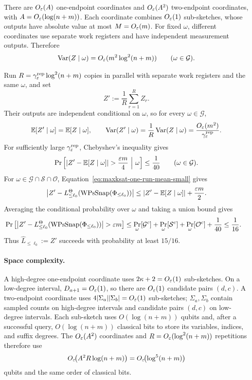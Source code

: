 There are $O_\varepsilon(A)$ one-endpoint coordinates and $O_\varepsilon(A^2)$ two-endpoint coordinates, with $A=O_\varepsilon(\log(n+m))$.
Each coordinate combines $O_\varepsilon(1)$ sub-sketches, whose outputs have absolute value at most $M=O_\varepsilon(m)$.
For fixed $\omega$, different coordinates use separate work registers and have independent measurement outputs. Therefore
\begin{equation}\label{eq:maxksat-one-run-var}
\operatorname{Var}(Z\mid\omega)=O_\varepsilon(m^2\log^2(n+m))
\qquad(\omega\in\mathcal G).
\end{equation}

Run $R=\gamma^{\mathrm{rep}}_\varepsilon\log^2(n+m)$ copies in parallel with separate work registers and the same $\omega$, and set
\[
Z':=\frac1R\sum_{r=1}^R Z_r.
\]
Their outputs are independent conditional on $\omega$, so for every $\omega\in\mathcal G$,
\[
\mathbb E[Z'\mid\omega]=\mathbb E[Z\mid\omega],\qquad
\operatorname{Var}(Z'\mid\omega)
=\frac1R\operatorname{Var}(Z\mid\omega)
=\frac{O_\varepsilon(m^2)}{\gamma^{\mathrm{rep}}_\varepsilon}.
\]
For sufficiently large $\gamma^{\mathrm{rep}}_\varepsilon$, Chebyshev's inequality gives
\[
\Pr\left[\left|Z'-\mathbb E[Z\mid\omega]\right|>\frac{\eps m}{4}
\ \middle|\ \omega\right]\le\frac1{40}
\qquad(\omega\in\mathcal G).
\]
For $\omega\in\mathcal G\cap\mathcal S\cap\mathcal O$, Equation~\eqref{eq:maxksat-one-run-mean-small} gives
\[
\left|Z'-L_{\le\ell_0}^\Theta(\operatorname{WPsSnap}(\Phi_{\le\ell_0}))\right|
\le\left|Z'-\mathbb E[Z\mid\omega]\right|+\frac{\varepsilon m}{2}.
\]
Averaging the conditional probability over $\omega$ and taking a union bound gives
\[
\begin{aligned}
&\Pr\left[\left|Z'-L_{\le\ell_0}^\Theta(\PsSnap(\Phi_{\le\ell_0}))\right|>\eps m\right]
\le\Pr_\omega[\mathcal G^c]+\Pr_\omega[\mathcal S^c]+\Pr_\omega[\mathcal O^c]+\frac1{40}\le\frac1{16}.
\end{aligned}
\]
Thus $\widehat L_{\le\ell_0}:=Z'$ succeeds with probability at least $15/16$.

\paragraph{Space complexity.}
A high-degree one-endpoint coordinate uses $2\kappa+2=O_\varepsilon(1)$ sub-sketches.
On a low-degree interval, $D_{a+1}=O_\varepsilon(1)$, so there are $O_\varepsilon(1)$ candidate pairs $(d,c)$.
A two-endpoint coordinate uses $4|\Sigma_a||\Sigma_b|=O_\varepsilon(1)$ sub-sketches; $\Sigma_a,\Sigma_b$ contain sampled counts on high-degree intervals and candidate pairs $(d,c)$ on low-degree intervals.
Each sub-sketch uses $O(\log(n+m))$ qubits and, after a successful query, $O(\log(n+m))$ classical bits to store its variables, indices, and suffix degrees.
The $O_\varepsilon(A^2)$ coordinates and $R=O_\varepsilon(\log^2(n+m))$ repetitions therefore use
\[
O_\varepsilon\!\bigl(A^2R\log(n+m)\bigr)=O_\varepsilon\!\bigl(\log^5(n+m)\bigr)
\]
qubits and the same order of classical bits.
